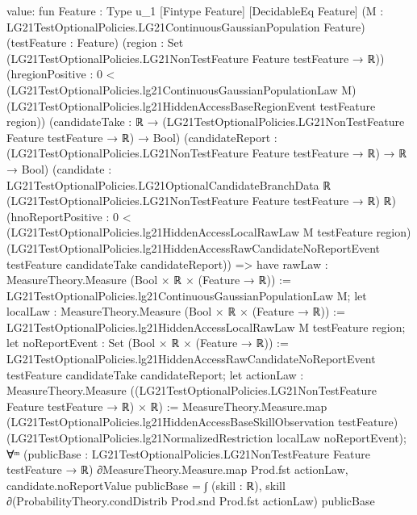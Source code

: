 \documentclass[10pt]{article}
\begin{document}
\begin{ReviewVerbatim}
value:
fun {Feature : Type u_1} [Fintype Feature] [DecidableEq Feature]
    (M : LG21TestOptionalPolicies.LG21ContinuousGaussianPopulation Feature) (testFeature : Feature)
    (region : Set (LG21TestOptionalPolicies.LG21NonTestFeature Feature testFeature → ℝ))
    (hregionPositive :
      0 <
        (LG21TestOptionalPolicies.lg21ContinuousGaussianPopulationLaw M)
          (LG21TestOptionalPolicies.lg21HiddenAccessBaseRegionEvent testFeature region))
    (candidateTake : ℝ → (LG21TestOptionalPolicies.LG21NonTestFeature Feature testFeature → ℝ) → Bool)
    (candidateReport : (LG21TestOptionalPolicies.LG21NonTestFeature Feature testFeature → ℝ) → ℝ → Bool)
    (candidate :
      LG21TestOptionalPolicies.LG21OptionalCandidateBranchData ℝ
        (LG21TestOptionalPolicies.LG21NonTestFeature Feature testFeature → ℝ) ℝ)
    (hnoReportPositive :
      0 <
        (LG21TestOptionalPolicies.lg21HiddenAccessLocalRawLaw M testFeature region)
          (LG21TestOptionalPolicies.lg21HiddenAccessRawCandidateNoReportEvent testFeature candidateTake
            candidateReport)) =>
  have rawLaw : MeasureTheory.Measure (Bool × ℝ × (Feature → ℝ)) :=
    LG21TestOptionalPolicies.lg21ContinuousGaussianPopulationLaw M;
  let localLaw : MeasureTheory.Measure (Bool × ℝ × (Feature → ℝ)) :=
    LG21TestOptionalPolicies.lg21HiddenAccessLocalRawLaw M testFeature region;
  let noReportEvent : Set (Bool × ℝ × (Feature → ℝ)) :=
    LG21TestOptionalPolicies.lg21HiddenAccessRawCandidateNoReportEvent testFeature candidateTake candidateReport;
  let actionLaw : MeasureTheory.Measure ((LG21TestOptionalPolicies.LG21NonTestFeature Feature testFeature → ℝ) × ℝ) :=
    MeasureTheory.Measure.map (LG21TestOptionalPolicies.lg21HiddenAccessBaseSkillObservation testFeature)
      (LG21TestOptionalPolicies.lg21NormalizedRestriction localLaw noReportEvent);
  ∀ᵐ (publicBase :
    LG21TestOptionalPolicies.LG21NonTestFeature Feature testFeature → ℝ) ∂MeasureTheory.Measure.map Prod.fst actionLaw,
    candidate.noReportValue publicBase =
      ∫ (skill : ℝ), skill ∂(ProbabilityTheory.condDistrib Prod.snd Prod.fst actionLaw) publicBase
\end{ReviewVerbatim}
\end{document}
